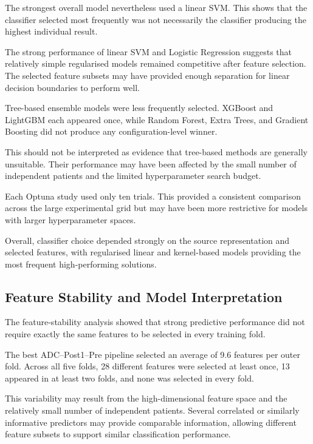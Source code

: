 \documentclass[12pt,twocolumn]{article}
\begin{document}
The strongest overall model nevertheless used a linear SVM. This shows
that the classifier selected most frequently was not necessarily the
classifier producing the highest individual result.

The strong performance of linear SVM and Logistic Regression suggests
that relatively simple regularised models remained competitive after
feature selection. The selected feature subsets may have provided
enough separation for linear decision boundaries to perform well.

Tree-based ensemble models were less frequently selected. XGBoost and
LightGBM each appeared once, while Random Forest, Extra Trees, and
Gradient Boosting did not produce any configuration-level winner.

This should not be interpreted as evidence that tree-based methods are
generally unsuitable. Their performance may have been affected by the
small number of independent patients and the limited hyperparameter
search budget.

Each Optuna study used only ten trials. This provided a consistent
comparison across the large experimental grid but may have been more
restrictive for models with larger hyperparameter spaces.

Overall, classifier choice depended strongly on the source
representation and selected features, with regularised linear and
kernel-based models providing the most frequent high-performing
solutions.


\subsection{Feature Stability and Model Interpretation}
\label{subsec:discussion_interpretability}

The feature-stability analysis showed that strong predictive
performance did not require exactly the same features to be selected
in every training fold.

The best ADC--Post1--Pre pipeline selected an average of 9.6 features
per outer fold. Across all five folds, 28 different features were
selected at least once, 13 appeared in at least two folds, and none was
selected in every fold.

This variability may result from the high-dimensional feature space
and the relatively small number of independent patients. Several
correlated or similarly informative predictors may provide comparable
information, allowing different feature subsets to support similar
classification performance.
\end{document}
